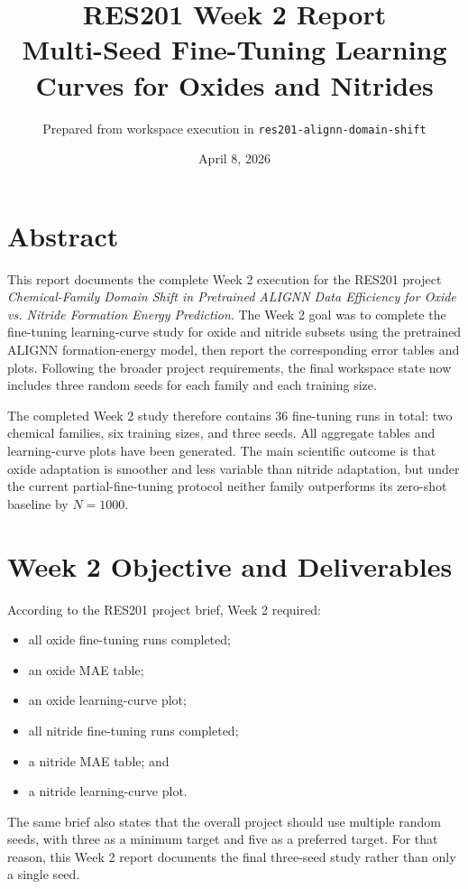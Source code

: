 \documentclass[11pt]{article}
\title{RES201 Week 2 Report\\Multi-Seed Fine-Tuning Learning Curves for Oxides and Nitrides}
\author{Prepared from workspace execution in \texttt{res201-alignn-domain-shift}}
\date{April 8, 2026}
\begin{document}
\maketitle

\section{Abstract}
This report documents the complete Week 2 execution for the RES201 project
\textit{Chemical-Family Domain Shift in Pretrained ALIGNN Data Efficiency for Oxide vs. Nitride Formation Energy Prediction}.
The Week 2 goal was to complete the fine-tuning learning-curve study for oxide and nitride subsets using the pretrained ALIGNN formation-energy model, then report the corresponding error tables and plots.
Following the broader project requirements, the final workspace state now includes three random seeds for each family and each training size.

The completed Week 2 study therefore contains 36 fine-tuning runs in total:
two chemical families, six training sizes, and three seeds.
All aggregate tables and learning-curve plots have been generated.
The main scientific outcome is that oxide adaptation is smoother and less variable than nitride adaptation, but under the current partial-fine-tuning protocol neither family outperforms its zero-shot baseline by $N=1000$.

\section{Week 2 Objective and Deliverables}
According to the RES201 project brief, Week 2 required:
\begin{itemize}
  \item all oxide fine-tuning runs completed;
  \item an oxide MAE table;
  \item an oxide learning-curve plot;
  \item all nitride fine-tuning runs completed;
  \item a nitride MAE table; and
  \item a nitride learning-curve plot.
\end{itemize}

The same brief also states that the overall project should use multiple random seeds, with three as a minimum target and five as a preferred target.
For that reason, this Week 2 report documents the final three-seed study rather than only a single seed.
\end{document}
